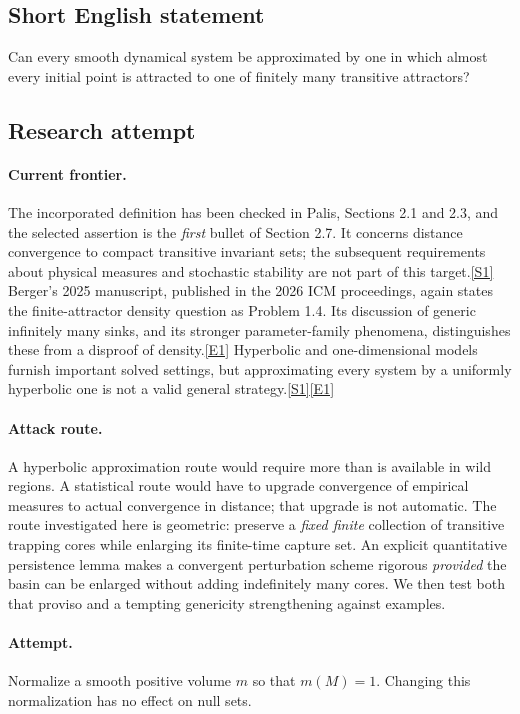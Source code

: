 \documentclass[11pt,a4paper]{article}
\newcommand{\sref}[2]{\hyperlink{source:#1:#2}{[S#2]}}
\newcommand{\eref}[2]{\hyperlink{extra:#1:#2}{[E#2]}}
\begin{document}
\subsection{Short English statement}
Can every smooth dynamical system be approximated by one in which almost every initial point is attracted to one of finitely many transitive attractors?
\subsection{Research attempt}

\paragraph{Current frontier.}
The incorporated definition has been checked in Palis, Sections 2.1 and
2.3, and the selected assertion is the \emph{first} bullet of Section 2.7.
It concerns distance convergence to compact transitive invariant sets;
the subsequent requirements about physical measures and stochastic
stability are not part of this target.\sref{statement}{1}
Berger's 2025 manuscript, published in the 2026 ICM proceedings, again
states the finite-attractor density question as Problem 1.4. Its discussion
of generic infinitely many sinks, and its stronger parameter-family
phenomena, distinguishes these from a disproof of density.\eref{statement}{1}
Hyperbolic and one-dimensional models furnish important solved settings,
but approximating every system by a uniformly hyperbolic one is not a
valid general strategy.\sref{statement}{1}\eref{statement}{1}

\paragraph{Attack route.}
A hyperbolic approximation route would require more than is available in
wild regions. A statistical route would have to upgrade convergence of
empirical measures to actual convergence in distance; that upgrade is
not automatic. The route investigated here is geometric: preserve a
\emph{fixed finite} collection of transitive trapping cores while enlarging
its finite-time capture set. An explicit quantitative persistence lemma
makes a convergent perturbation scheme rigorous \emph{provided} the basin
can be enlarged without adding indefinitely many cores. We then test both
that proviso and a tempting genericity strengthening against examples.

\paragraph{Attempt.}
Normalize a smooth positive volume $m$ so that $m(M)=1$. Changing this
normalization has no effect on null sets.
\end{document}
